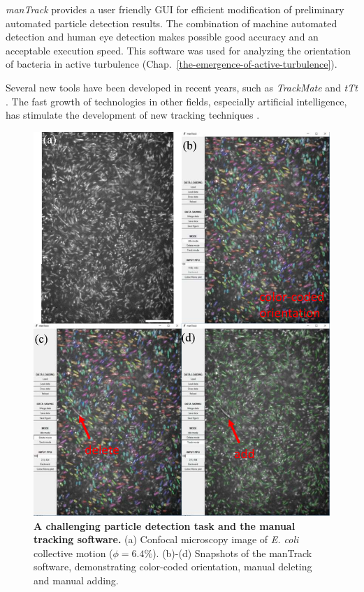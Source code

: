 \textit{manTrack} provides a user friendly GUI for efficient modification of preliminary automated particle detection results. The combination of machine automated detection and human eye detection makes possible good accuracy and an acceptable execution speed. This software was used for analyzing the orientation of bacteria in active turbulence (Chap.~\ref{the-emergence-of-active-turbulence}).

Several new tools have been developed in recent years, such as \textit{TrackMate} and \textit{tTt} \cite{Tinevez2017, Hilsenbeck2016}. The fast growth of technologies in other fields, especially artificial intelligence, has stimulate the development of new tracking techniques \cite{Newby2018, Moen2019}.

\begin{figure}[!htbp]
	\begin{center}
	\includegraphics[width=5.5 in]{Figs/2-Exp/6.pdf}
	\end{center}
	\caption[Figure 2.6:]
	{
	\textbf{A challenging particle detection task and the manual tracking software.}
	(a) Confocal microscopy image of \textit{E. coli} collective motion ($\phi=6.4\%$).
	(b)-(d) Snapshots of the manTrack software, demonstrating color-coded orientation, manual deleting and manual adding.
	}
	\label{fig:2-6}
\end{figure}








